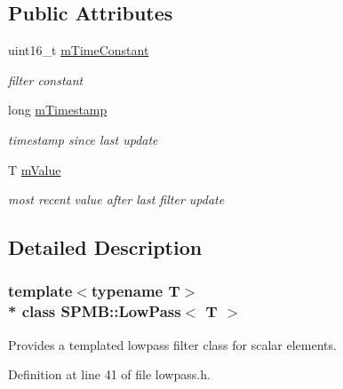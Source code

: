 \subsection*{Public Attributes}
\begin{DoxyCompactItemize}
\item 
uint16\+\_\+t \hyperlink{classSPMB_1_1LowPass_a3272be66039cc317ae295f7e4ce90c23}{m\+Time\+Constant}\hypertarget{classSPMB_1_1LowPass_a3272be66039cc317ae295f7e4ce90c23}{}\label{classSPMB_1_1LowPass_a3272be66039cc317ae295f7e4ce90c23}

\begin{DoxyCompactList}\small\item\em filter constant \end{DoxyCompactList}\item 
long \hyperlink{classSPMB_1_1LowPass_a0d65cef27970b458eb9a8065e3141eae}{m\+Timestamp}\hypertarget{classSPMB_1_1LowPass_a0d65cef27970b458eb9a8065e3141eae}{}\label{classSPMB_1_1LowPass_a0d65cef27970b458eb9a8065e3141eae}

\begin{DoxyCompactList}\small\item\em timestamp since last update \end{DoxyCompactList}\item 
T \hyperlink{classSPMB_1_1LowPass_a63f1e9ef7ccb4a1b51ebb81681d377ec}{m\+Value}\hypertarget{classSPMB_1_1LowPass_a63f1e9ef7ccb4a1b51ebb81681d377ec}{}\label{classSPMB_1_1LowPass_a63f1e9ef7ccb4a1b51ebb81681d377ec}

\begin{DoxyCompactList}\small\item\em most recent value after last filter update \end{DoxyCompactList}\end{DoxyCompactItemize}


\subsection{Detailed Description}
\subsubsection*{template$<$typename T$>$\\*
class S\+P\+M\+B\+::\+Low\+Pass$<$ T $>$}

Provides a templated lowpass filter class for scalar elements. 

Definition at line 41 of file lowpass.\+h.

